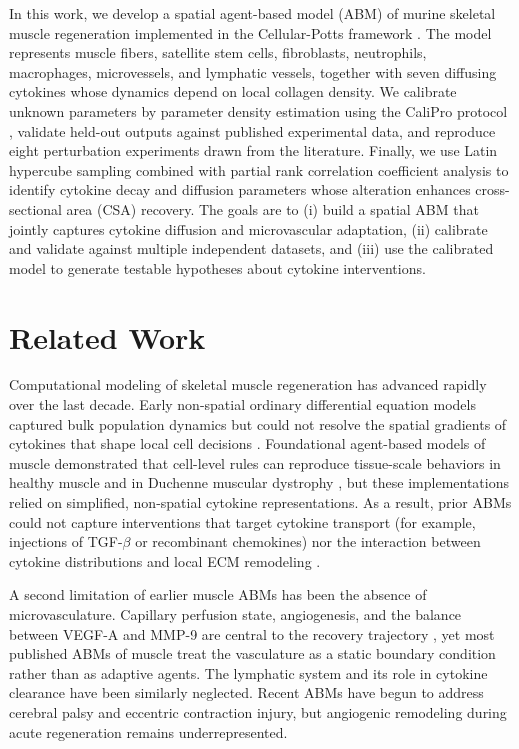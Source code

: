 In this work, we develop a spatial agent-based model (ABM) of murine skeletal muscle regeneration implemented in the Cellular-Potts framework \cite{graner1992simulation,swat2012compucell3d}. The model represents muscle fibers, satellite stem cells, fibroblasts, neutrophils, macrophages, microvessels, and lymphatic vessels, together with seven diffusing cytokines whose dynamics depend on local collagen density. We calibrate unknown parameters by parameter density estimation using the CaliPro protocol \cite{joslyn2021calipro}, validate held-out outputs against published experimental data, and reproduce eight perturbation experiments drawn from the literature. Finally, we use Latin hypercube sampling combined with partial rank correlation coefficient analysis \cite{marino2008sensitivity} to identify cytokine decay and diffusion parameters whose alteration enhances cross-sectional area (CSA) recovery. The goals are to (i) build a spatial ABM that jointly captures cytokine diffusion and microvascular adaptation, (ii) calibrate and validate against multiple independent datasets, and (iii) use the calibrated model to generate testable hypotheses about cytokine interventions.

\section{Related Work}

Computational modeling of skeletal muscle regeneration has advanced rapidly over the last decade. Early non-spatial ordinary differential equation models captured bulk population dynamics but could not resolve the spatial gradients of cytokines that shape local cell decisions \cite{hillen2009user}. Foundational agent-based models of muscle demonstrated that cell-level rules can reproduce tissue-scale behaviors in healthy muscle and in Duchenne muscular dystrophy \cite{virgilio2015multiscale,martin2017agent}, but these implementations relied on simplified, non-spatial cytokine representations. As a result, prior ABMs could not capture interventions that target cytokine transport (for example, injections of TGF-$\beta$ or recombinant chemokines) nor the interaction between cytokine distributions and local ECM remodeling \cite{urciuolo2013collagen}.

A second limitation of earlier muscle ABMs has been the absence of microvasculature. Capillary perfusion state, angiogenesis, and the balance between VEGF-A and MMP-9 are central to the recovery trajectory \cite{carmeliet2003angiogenesis}, yet most published ABMs of muscle treat the vasculature as a static boundary condition rather than as adaptive agents. The lymphatic system and its role in cytokine clearance have been similarly neglected. Recent ABMs have begun to address cerebral palsy and eccentric contraction injury, but angiogenic remodeling during acute regeneration remains underrepresented.

